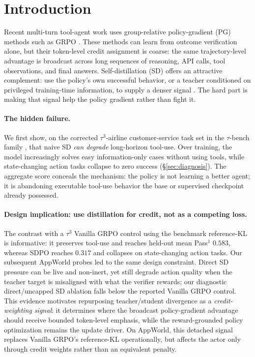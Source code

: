 \section{Introduction}
\label{sec:intro}

Recent multi-turn tool-agent work \citep{coevolve2026,multiturnguide2025} uses
group-relative policy-gradient (PG) methods such as GRPO
\citep{deepseekmath2024}. These methods can
learn from outcome verification alone, but their token-level credit assignment is
coarse: the same trajectory-level advantage is broadcast across long sequences
of reasoning, API calls, tool observations, and final answers. Self-distillation
(SD) offers an attractive complement: use the policy's own successful behavior,
or a teacher conditioned on privileged training-time information, to supply a
denser signal \citep{sdpo2026,opsd2026,skillsd2026,sdar2026}. The hard part is
making that signal help the policy gradient rather than fight it.

\paragraph{The hidden failure.} We first show, on the corrected $\tau^3$-airline
customer-service task set in the $\tau$-bench family
\citep{taubench2024,tau2bench2025,tau3bench2026}, that naive SD
\emph{can degrade} long-horizon tool-use. Over training, the model
increasingly solves easy information-only cases without using tools, while
state-changing action tasks collapse to zero success (\S\ref{sec:diagnosis}).
The aggregate score conceals the mechanism: the policy is not learning a better
agent; it is abandoning executable tool-use behavior the base or supervised
checkpoint already possessed.

\paragraph{Design implication: use distillation for credit, not as a competing loss.}
The contrast with a $\tau^3$ Vanilla GRPO control using the benchmark
reference-KL is informative: it preserves
tool-use and reaches held-out mean Pass$^1$ $0.583$, whereas SDPO reaches
$0.317$ and collapses on state-changing action tasks. Our subsequent
AppWorld probes led to the
same design constraint. Direct SD pressure can be live and non-inert, yet still
degrade action quality when the teacher target is misaligned with what the
verifier rewards; our diagnostic direct/uncapped SD ablation
falls below the reported Vanilla GRPO control. This evidence motivates
repurposing
teacher/student divergence as a \emph{credit-weighting signal}: it determines
where the broadcast policy-gradient advantage should receive bounded
token-level emphasis, while the
reward-grounded policy optimization remains the update driver. On AppWorld,
this detached signal replaces Vanilla GRPO's reference-KL operationally, but
affects the actor only through credit weights rather than an equivalent penalty.


